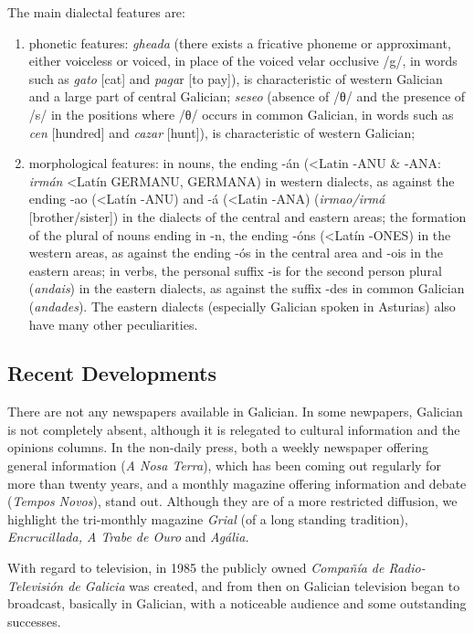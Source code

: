 \begin{multicols}{2}
The main dialectal features are:

\begin{enumerate}
   \item phonetic features: \textit{gheada} (there exists a fricative phoneme or approximant, either voiceless or voiced, in place of the voiced velar occlusive /g/, in words such as \textit{gato} [cat] and \textit{paga}r [to pay]), is characteristic of western Galician and a large part of central Galician; \textit{seseo} (absence of /θ/ and the presence of /s/ in the positions where /θ/ occurs in common Galician, in words such as \textit{cen} [hundred] and \textit{cazar} [hunt]), is characteristic of western Galician; 
   \item morphological features: in nouns, the ending -án (<Latin -ANU \& -ANA: \textit{irmán} <Latín GERMANU, GERMANA) in western dialects, as against the ending -ao (<Latín -ANU) and -á (<Latin -ANA) (\textit{irmao/irmá} [brother/sister]) in the dialects of the central and eastern areas; the formation of the plural of nouns ending in -n, the ending -óns (<Latín -ONES) in the western areas, as against the ending -ós in the central area and -ois in the eastern areas; in verbs, the personal suffix -is for the second person plural (\textit{andais}) in the eastern dialects, as against the suffix -des in common Galician (\textit{andades}). The eastern dialects (especially Galician spoken in Asturias) also have many other peculiarities.
\end{enumerate}


\subsection{Recent Developments}

There are not any newspapers available in Galician. In some newpapers, Galician is not completely absent, although it is relegated to cultural information and the opinions columns. In the non-daily press, both a weekly newspaper offering general information (\textit{A Nosa Terra}), which has been coming out regularly for more than twenty years, and a monthly magazine offering information and debate (\textit{Tempos Novos}), stand out. Although they are of a more restricted diffusion, we highlight the tri-monthly magazine \textit{Grial} (of a long standing tradition), \textit{Encrucillada, A Trabe de Ouro} and \textit{Agália.} 

With regard to television, in 1985 the publicly owned \textit{Compañía de Radio-Televisión de Galicia} was created, and from then on Galician television began to broadcast, basically in Galician, with a noticeable audience and some outstanding successes. 


\end{multicols}
